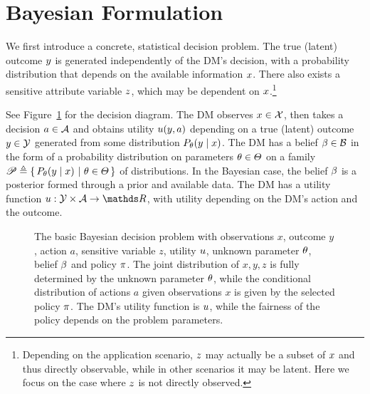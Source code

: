 
\section{Bayesian Formulation}
\label{sec:formulation}

We first introduce a concrete, statistical decision problem. The true
(latent) outcome $y$ is generated independently of the DM's
decision, with a probability distribution that depends on the
available information $x$. There also exists a sensitive attribute
variable $z$, which may be dependent on $x$.\footnote{Depending
  on the application scenario, $z$ may actually be a subset of
  $x$ and thus directly observable, while in other scenarios it may
  be latent. Here we focus on the case where $z$ is not directly
  observed.}

\begin{definition}
 See Figure~\ref{fig:bayes-rule} for the decision diagram. The DM
 observes $x \in \mathcal{X}$, then takes a decision $a \in \mathcal{A}$ and
 obtains utility $u(y, a)$ depending on a true (latent)
 outcome $y \in \mathcal{Y}$ generated from some distribution
 $P_\theta(y \mid x)$.  The DM has a belief $\beta \in \mathcal{B}$ in
 the form of a probability distribution on parameters $\theta \in
 \Theta$ on a family $\mathscr{P} \mathrel{\triangleq} \left\{\, P_\theta(y \mid x) ~\middle|~ \theta
   \in \Theta \,\right\}$ of distributions. In the Bayesian case, the belief
 $\beta$ is a posterior formed through a prior and available data. The
 DM has a utility function $\util : \CY \times \CA \to \Reals$, with
 utility depending on the DM's action and the outcome.
  \begin{figure}
    \centering
    \caption{The basic Bayesian decision problem with observations $x$, outcome $y$, action $a$,  sensitive variable $z$,  utility $u$, unknown parameter $\theta$, belief $\beta$ and policy $\pi$. The joint distribution of $x,y,z$ is fully determined by the unknown parameter $\theta$, while the conditional distribution of actions $a$ given observations $x$ is given by the selected policy $\pi$. The DM's  utility function is $u$, while the fairness of the policy depends on the problem parameters.}
    \label{fig:bayes-rule}
  \end{figure}
\end{definition}

